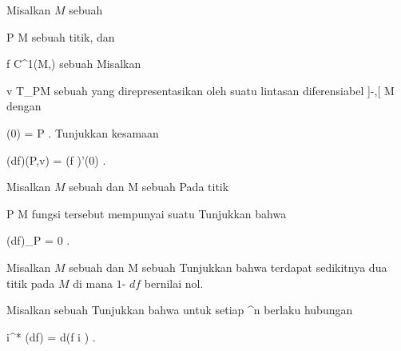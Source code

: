 {}
{

Misalkan $M$ sebuah

\mavergleichskette
{\vergleichskette
{ P
}
{ \in }{ M
}
{  }{
}
{    }{
}
{   }{
}
}
{}{}{}
sebuah titik, dan

\mavergleichskette
{\vergleichskette
{ f
}
{ \in }{ C^1(M,\R)
}
{  }{
}
{    }{
}
{   }{
}
}
{}{}{}
sebuah
Misalkan

\mavergleichskette
{\vergleichskette
{ v
}
{ \in }{ T_PM
}
{  }{
}
{    }{
}
{   }{
}
}
{}{}{}
sebuah
yang direpresentasikan oleh suatu lintasan diferensiabel
\maabbdisp {\gamma} {{]{-\delta},\delta [}} {M
} {}
dengan

\mavergleichskette
{\vergleichskette
{ \gamma(0)
}
{ = }{ P
}
{  }{
}
{    }{
}
{   }{
}
}
{}{}{.}
Tunjukkan kesamaan

\mavergleichskettedisp
{\vergleichskette
{(df)(P,v)
}
{ =} { (f \circ \gamma)'(0)
}
{ } {
}
{ } {
}
{ } {
}
}
{}{}{.}

}
{} {}

{}
{

Misalkan $M$ sebuah
dan
 { M } {\R
} {}
sebuah
Pada titik

\mavergleichskette
{\vergleichskette
{ P
}
{ \in }{ M
}
{  }{
}
{    }{
}
{   }{
}
}
{}{}{}
fungsi tersebut mempunyai suatu
Tunjukkan bahwa

\mavergleichskettedisp
{\vergleichskette
{ (df)_P
}
{ =} { 0
}
{ } {
}
{ } {
}
{ } {
}
}
{}{}{.}

}
{} {}

{}
{

Misalkan $M$ sebuah
dan
 { M } {\R
} {}
sebuah
Tunjukkan bahwa terdapat sedikitnya dua titik pada $M$
 {} {}
di mana
$1$-
$df$ bernilai nol.

}
{} {}

{}
{

Misalkan
 sebuah
Tunjukkan bahwa untuk setiap
 {\R^n } {\R
} {}
berlaku hubungan

\mavergleichskettedisp
{\vergleichskette
{ i^* (df)
}
{ =} { d(f \circ i )
}
{ } {
}
{ } {
}
{ } {
}
}
{}{}{.}

}
{} {}

